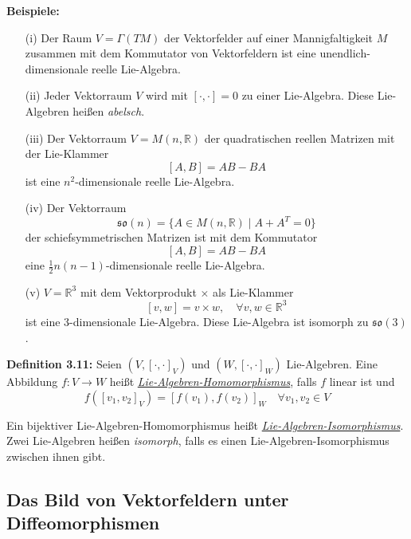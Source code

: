 \documentclass[fleqn, 12pt, letterpaper]{article}
\begin{document}
\textbf{Beispiele:}
\begin{itemize}
  \item[(i)] Der Raum \( V = \Gamma(TM) \) der Vektorfelder auf einer Mannigfaltigkeit \( M \) zusammen mit dem Kommutator von Vektorfeldern ist eine unendlich-dimensionale reelle Lie-Algebra.

  \item[(ii)] Jeder Vektorraum \( V \) wird mit \( [\cdot,\cdot] = 0 \) zu einer Lie-Algebra. Diese Lie-Algebren heißen \emph{abelsch}.

  \item[(iii)] Der Vektorraum \( V = M(n, \mathbb{R}) \) der quadratischen reellen Matrizen mit der Lie-Klammer
  \[
  [A, B] = AB - BA
  \]
  ist eine \( n^2 \)-dimensionale reelle Lie-Algebra.

  \item[(iv)] Der Vektorraum
  \[
  \mathfrak{so}(n) = \{ A \in M(n, \mathbb{R}) \mid A + A^T = 0 \}
  \]
  der schiefsymmetrischen Matrizen ist mit dem Kommutator
  \[
  [A, B] = AB - BA
  \]
  eine \( \frac{1}{2} n(n-1) \)-dimensionale reelle Lie-Algebra.
\end{itemize}
\begin{itemize}
  \item[(v)] \( V = \mathbb{R}^3 \) mit dem Vektorprodukt \( \times \) als Lie-Klammer
  \[
  [v, w] = v \times w, \quad \forall v, w \in \mathbb{R}^3
  \]
  ist eine 3-dimensionale Lie-Algebra. Diese Lie-Algebra ist isomorph zu \( \mathfrak{so}(3) \).
\end{itemize}

\medskip

\textbf{Definition 3.11:}
Seien \( (V, [\cdot,\cdot]_V) \) und \( (W, [\cdot,\cdot]_W) \) Lie-Algebren. Eine Abbildung \( f \colon V \to W \) heißt \emph{\underline{Lie-Algebren-Homomorphismus}}, falls \( f \) linear ist und
\[
f([v_1, v_2]_V) = [f(v_1), f(v_2)]_W \quad \forall v_1, v_2 \in V
\]

\medskip

Ein bijektiver Lie-Algebren-Homomorphismus heißt \emph{\underline{Lie-Algebren-Isomorphismus}}. \\
Zwei Lie-Algebren heißen \emph{isomorph}, falls es einen Lie-Algebren-Isomorphismus zwischen ihnen gibt.


\subsection{Das Bild von Vektorfeldern unter Diffeomorphismen}
\end{document}
